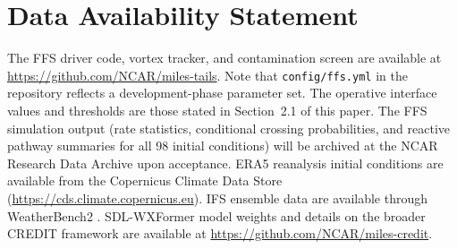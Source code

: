 \documentclass[11pt]{article}
\begin{document}
\section*{Data Availability Statement}
The FFS driver code, vortex tracker, and contamination screen are available at
\url{https://github.com/NCAR/miles-tails}.
Note that \texttt{config/ffs.yml} in the repository reflects a development-phase
parameter set. The operative interface values and thresholds are those stated in
Section~2.1 of this paper.
The FFS simulation output (rate statistics, conditional crossing probabilities, and
reactive pathway summaries for all 98 initial conditions) will be archived at the
NCAR Research Data Archive upon acceptance.
ERA5 reanalysis initial conditions \citep{hersbach2020era5} are available from the
Copernicus Climate Data Store (\url{https://cds.climate.copernicus.eu}).
IFS ensemble data are available through WeatherBench2 \citep{rasp2024weatherbench2}.
SDL-WXFormer model weights and details on the broader CREDIT framework are available at
\url{https://github.com/NCAR/miles-credit}.



\end{document}
